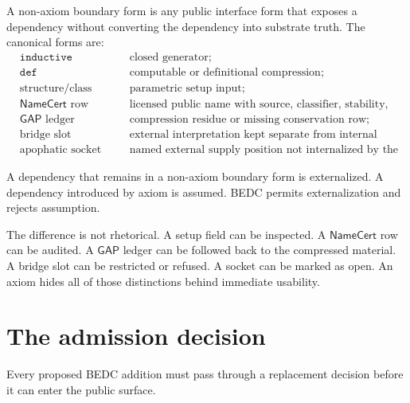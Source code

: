 \begin{definition}
\label{def:external-supply-non-axiom-boundary-form}
A non-axiom boundary form is any public interface form that exposes a dependency without converting the dependency into substrate truth. The canonical forms are:
$$
\begin{aligned}
&\texttt{inductive} && \text{closed generator;} \\
&\texttt{def} && \text{computable or definitional compression;} \\
&\text{structure/class field} && \text{parametric setup input;} \\
&\mathsf{NameCert}\text{ row} && \text{licensed public name with source, classifier, stability, ledger;} \\
&\mathsf{GAP}\text{ ledger} && \text{compression residue or missing conservation row;} \\
&\text{bridge slot} && \text{external interpretation kept separate from internal proof;} \\
&\text{apophatic socket} && \text{named external supply position not internalized by the substrate.}
\end{aligned}
$$
\end{definition}

\begin{principle}
\label{prin:external-supply-externalized-not-assumed}
A dependency that remains in a non-axiom boundary form is externalized. A dependency introduced by axiom is assumed. BEDC permits externalization and rejects assumption.
\end{principle}

The difference is not rhetorical. A setup field can be inspected. A $\mathsf{NameCert}$ row can be audited. A $\mathsf{GAP}$ ledger can be followed back to the compressed material. A bridge slot can be restricted or refused. A socket can be marked as open. An axiom hides all of those distinctions behind immediate usability.

\section{The admission decision}
\label{sec:external-supply-admission-decision}

Every proposed BEDC addition must pass through a replacement decision before it can enter the public surface.

